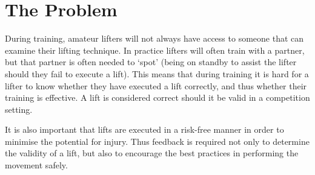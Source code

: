 
\section{The Problem}

During training, amateur lifters will not always have access to someone that can examine their lifting technique. In practice lifters will often train with a partner, but that partner is often needed to `spot' (being on standby to assist the lifter should they fail to execute a lift). This means that during training it is hard for a lifter to know whether they have executed a lift correctly, and thus whether their training is effective. A lift is considered correct should it be valid in a competition setting.

It is also important that lifts are executed in a risk-free manner in order to minimise the potential for injury. Thus feedback is required not only to determine the validity of a lift, but also to encourage the best practices in performing the movement safely.